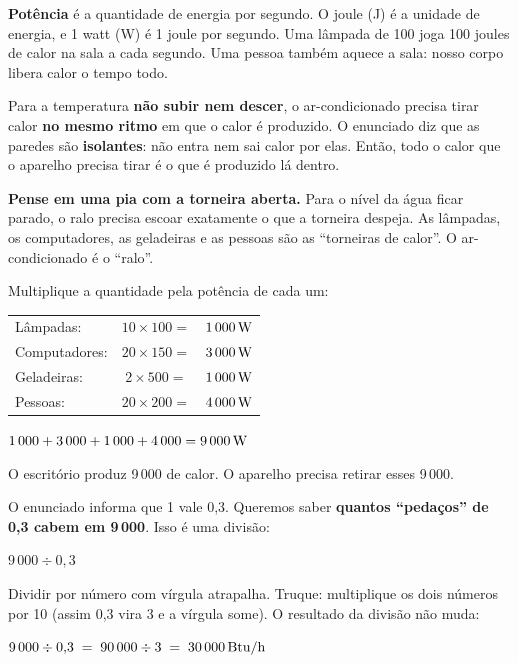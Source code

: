 \begin{enunciado}

\end{enunciado}


\begin{ideia}
\textbf{Potência} é a quantidade de energia por segundo. O joule (J) é a unidade de energia, e 1 watt (W) é 1 joule por segundo.
Uma lâmpada de 100 joga 100 joules de calor na sala a cada segundo.
Uma pessoa também aquece a sala: nosso corpo libera calor o tempo todo.

Para a temperatura \textbf{não subir nem descer}, o ar-condicionado precisa tirar calor \textbf{no mesmo ritmo} em que o calor é produzido.
O enunciado diz que as paredes são \textbf{isolantes}: não entra nem sai calor por elas. Então, todo o calor que o aparelho
precisa tirar é o que é produzido lá dentro.

\textbf{Pense em uma pia com a torneira aberta.} Para o nível da água ficar parado, o ralo precisa escoar exatamente o que a
torneira despeja. As lâmpadas, os computadores, as geladeiras e as pessoas são as ``torneiras de calor''. O ar-condicionado é o ``ralo''.
\end{ideia}

\passoapasso
{}
Multiplique a quantidade pela potência de cada um:
\begin{conta}
\renewcommand{\arraystretch}{1.25}
\begin{tabular}{lcl}
Lâmpadas: & $10 \times 100 =$ & $1\,000\,\text{W}$\\
Computadores: & $20 \times 150 =$ & $3\,000\,\text{W}$\\
Geladeiras: & $2 \times 500 =$ & $1\,000\,\text{W}$\\
Pessoas: & $20 \times 200 =$ & $4\,000\,\text{W}$
\end{tabular}
\end{conta}

\begin{conta}
$1\,000 + 3\,000 + 1\,000 + 4\,000 = 9\,000\,\text{W}$
\end{conta}
O escritório produz 9\,000 de calor. O aparelho precisa retirar esses 9\,000.

O enunciado informa que 1 vale 0,3. Queremos saber \textbf{quantos ``pedaços'' de 0,3 cabem em 9\,000}.
Isso é uma divisão:
\begin{conta}
$9\,000 \div 0{,}3$
\end{conta}
Dividir por número com vírgula atrapalha. Truque: multiplique os dois números por 10 (assim 0,3 vira 3 e a vírgula some). O resultado da divisão não muda:
\begin{conta}
$9\,000 \div 0{,}3 \;=\; 90\,000 \div 3 \;=\; 30\,000\,\text{Btu/h}$
\end{conta}

